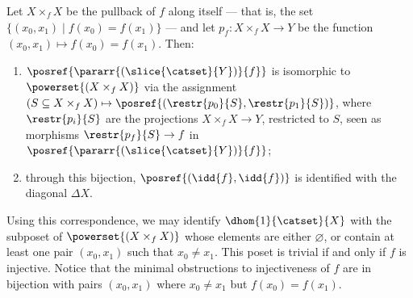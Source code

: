 %
%
\begin{proposition}\label{prop: dhom1 for set/y}
    Let $X \times_f X$ be the pullback of $f$ along itself --- that is, the set $\{(x_0, x_1) \mid f(x_0) = f(x_1)\}$ --- and let $p_f\colon X \times_f X \to Y$ be the function $(x_0, x_1) \mapsto f(x_0) = f(x_1)$. Then:
    \begin{enumerate}
        \item $\posref{\pararr{(\slice{\catset}{Y})}{f}}$ is isomorphic to $\powerset{(X \times_f X)}$ via the assignment $(S \subseteq X \times_f X) \mapsto \posref{(\restr{p_0}{S}, \restr{p_1}{S})}$, where $\restr{p_i}{S}$ are the projections $X \times_f X \to Y$, restricted to $S$, seen as morphisms $\restr{p_f}{S} \to f$ in $\posref{\pararr{(\slice{\catset}{Y})}{f}}$;
        \item through this bijection, $\posref{(\idd{f}, \idd{f})}$ is identified with the diagonal $\Delta X$.
    \end{enumerate}
\end{proposition}
%
%
Using this correspondence, we may identify $\dhom{1}{\catset}{X}$ with the subposet of $\powerset{(X \times_f X)}$ whose elements are either $\varnothing$, or contain at least one pair $(x_0, x_1)$ such that $x_0 \neq x_1$.
This poset is trivial if and only if $f$ is injective. 
Notice that the minimal obstructions to injectiveness of $f$ are in bijection with pairs $(x_0, x_1)$ where $x_0 \neq x_1$ but $f(x_0) = f(x_1)$.
%
%
